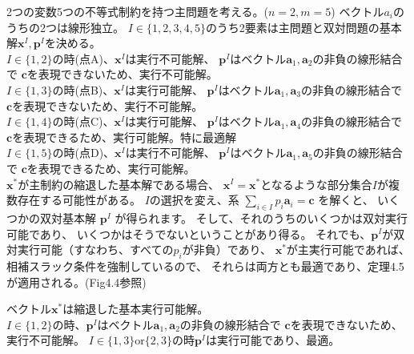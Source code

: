\documentclass{jsarticle}
\begin{document}
2つの変数5つの不等式制約を持つ主問題を考える。($n=2,m=5$)
ベクトル$a_i$のうちの2つは線形独立。
$I\in \{1,2,3,4,5\}$のうち2要素は主問題と双対問題の基本解$\bm{x}^I,\bm{p}^I$を決める。\\
$I\in \{1,2\}$の時(点A)、$\bm{x}^I$は実行不可能解、
$\bm{p}^I$はベクトル$\bm{a}_1,\bm{a}_2$の非負の線形結合で
$\bm{c}$を表現できないため、実行不可能解。\\
$I\in \{1,3\}$の時(点B)、$\bm{x}^I$は実行可能解、
$\bm{p}^I$はベクトル$\bm{a}_1,\bm{a}_3$の非負の線形結合で
$\bm{c}$を表現できないため、実行不可能解。\\
$I\in \{1,4\}$の時(点C)、$\bm{x}^I$は実行可能解、
$\bm{p}^I$はベクトル$\bm{a}_1,\bm{a}_4$の非負の線形結合で
$\bm{c}$を表現できるため、実行可能解。特に最適解\\
$I\in \{1,5\}$の時(点D)、$\bm{x}^I$は実行不可能解、
$\bm{p}^I$はベクトル$\bm{a}_1,\bm{a}_5$の非負の線形結合で
$\bm{c}$を表現できるため、実行可能解。\\

$\bm{x}^*$が主制約の縮退した基本解である場合、
$\bm{x}^I =\bm{x}^*$となるような部分集合$I$が複数存在する可能性がある。
$I$の選択を変え、系 $\sum_{i\in I}p_i\bm{a}_i=\bm{c}$ を解くと、
いくつかの双対基本解 $\bm{p}^I$ が得られます。
そして、それのうちのいくつかは双対実行可能であり、
いくつかはそうでないということがあり得る。
それでも、$\bm{p}^I$が双対実行可能（すなわち、すべての$p_i$が非負）であり、
$\bm{x}^*$が主実行可能であれば、相補スラック条件を強制しているので、
それらは両方とも最適であり、定理4.5が適用される。(Fig4.4参照)

ベクトル$\bm{x}^*$は縮退した基本実行可能解。\\
$I\in \{1,2\}$の時、$\bm{p}^I$はベクトル$\bm{a}_1,\bm{a}_2$の非負の線形結合で
$\bm{c}$を表現できないため、実行不可能解。
$I\in \{1,3\} \text{or} \{2,3\}$の時$\bm{p}^I$は実行可能であり、最適。
\end{document}

